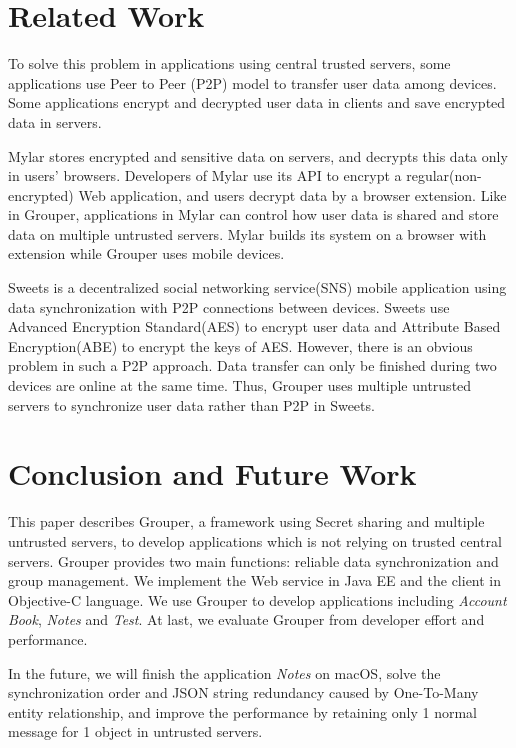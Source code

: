 \documentclass[twocolumn,10pt]{article}
\begin{document}
\section{Related Work}

To solve this problem in applications using central trusted servers, some applications use Peer to Peer (P2P) model to transfer user data among devices. Some applications encrypt and decrypted user data in clients and save encrypted data in servers. 

Mylar\cite{popa2014building} stores encrypted and sensitive data on servers, and decrypts this data only in users’ browsers. Developers of Mylar use its API to encrypt a regular(non-encrypted) Web application, and users decrypt data by a browser extension. Like in Grouper, applications in Mylar can control how user data is shared and store data on multiple untrusted servers. Mylar builds its system on a browser with extension while Grouper uses mobile devices.

Sweets\cite{sweets} is a decentralized social networking service(SNS) mobile application using data synchronization with P2P connections between devices. Sweets use Advanced Encryption Standard(AES) to encrypt user data and Attribute Based Encryption(ABE) to encrypt the keys of AES. However, there is an obvious problem in such a P2P approach. Data transfer can only be finished during two devices are online at the same time. Thus, Grouper uses multiple untrusted servers to synchronize user data rather than P2P in Sweets.

\section{Conclusion and Future Work}

This paper describes Grouper, a framework using Secret sharing and multiple untrusted servers, to develop applications which is not relying on trusted central servers. Grouper provides two main functions: reliable data synchronization and group management. We implement the Web service in Java EE and the client in Objective-C language. We use Grouper to develop applications including \emph{Account Book}, \emph{Notes} and \emph{Test}. At last, we evaluate Grouper from developer effort and performance. 

In the future, we will finish the application \emph{Notes} on macOS, solve the synchronization order and JSON string redundancy caused by One-To-Many entity relationship, and improve the performance by retaining only 1 normal message for 1 object in untrusted servers.


{
	\footnotesize
	
}
\end{document}
